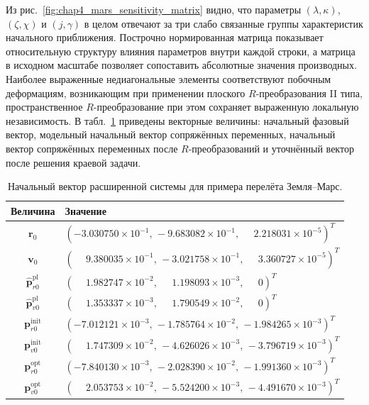Из рис.~\ref{fig:chap4_mars_sensitivity_matrix} видно, что параметры \((\lambda,\kappa)\), \((\zeta,\chi)\) и \((j,\gamma)\) в целом отвечают за три слабо связанные группы характеристик начального приближения. Построчно нормированная матрица показывает относительную структуру влияния параметров внутри каждой строки, а матрица в исходном масштабе позволяет сопоставить абсолютные значения производных. Наиболее выраженные недиагональные элементы соответствуют побочным деформациям, возникающим при применении плоского \(R\)-преобразования II типа, пространственное \(R\)-преобразование при этом сохраняет выраженную локальную независимость.
В табл.~\ref{tab:chap4_mars_example_vectors} приведены векторные величины: начальный фазовый вектор, модельный начальный вектор сопряжённых переменных, начальный вектор сопряжённых переменных после \(R\)-преобразований и уточнённый вектор после решения краевой задачи.

\begin{table}[htbp]
	\centering
	\caption{Начальный вектор расширенной системы для примера перелёта Земля--Марс.}
	\label{tab:chap4_mars_example_vectors}
	\begin{tabular}{cp{}}
		\toprule
		Величина & Значение \\
		\midrule
		\(\mathbf r_0\) &
		\((-3.030750\times10^{-1},\, -9.683082\times10^{-1},\, \phantom{-}2.218031\times10^{-5})^T\) \\
		\(\mathbf v_0\) &
		\((\phantom{-}9.380035\times10^{-1},\, -3.021758\times10^{-1},\, \phantom{-}3.360727\times10^{-5})^T\) \\
		\(\widehat{\mathbf p}_{r0}^{\mathrm{pl}}\) &
		\((\phantom{-}1.982747\times10^{-2},\, \phantom{-}1.198093\times10^{-3},\, \phantom{-}0)^T\) \\
		\(\widehat{\mathbf p}_{v0}^{\mathrm{pl}}\) &
		\((\phantom{-}1.353337\times10^{-3},\, \phantom{-}1.790549\times10^{-2},\, \phantom{-}0)^T\) \\
		\(\mathbf p_{r0}^{\mathrm{init}}\) &
		\((-7.012121\times10^{-3},\, -1.785764\times10^{-2},\, -1.984265\times10^{-3})^T\) \\
		\(\mathbf p_{v0}^{\mathrm{init}}\) &
		\((\phantom{-}1.747309\times10^{-2},\, -4.626026\times10^{-3},\, -3.796719\times10^{-3})^T\) \\
		\(\mathbf p_{r0}^{\mathrm{opt}}\) &
		\((-7.840130\times10^{-3},\, -2.028390\times10^{-2},\, -1.991360\times10^{-3})^T\) \\
		\(\mathbf p_{v0}^{\mathrm{opt}}\) &
		\((\phantom{-}2.053753\times10^{-2},\, -5.524200\times10^{-3},\, -4.491670\times10^{-3})^T\) \\
		\bottomrule
	\end{tabular}
\end{table}

